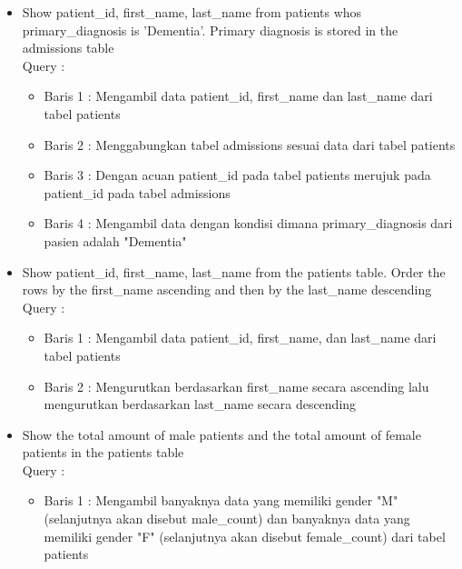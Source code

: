\documentclass[]{article}
\begin{document}
\begin{itemize}
        \item Show patient\_id, first\_name, last\_name from patients whos
        \\primary\_diagnosis is 'Dementia'. Primary diagnosis is stored in the admissions table
        \\Query :
        
        \begin{itemize}
            \item Baris 1 : Mengambil data patient\_id, first\_name dan last\_name dari tabel patients
            \item Baris 2 : Menggabungkan tabel admissions sesuai data dari tabel patients
            \item Baris 3 : Dengan acuan patient\_id pada tabel patients merujuk pada patient\_id pada tabel admissions
            \item Baris 4 : Mengambil data dengan kondisi dimana primary\_diagnosis dari pasien adalah "Dementia"
        \end{itemize}

        \item Show patient\_id, first\_name, last\_name from the patients table.
        Order the rows by the first\_name ascending and then by the last\_name descending
        \\Query :
        
        \begin{itemize}
            \item Baris 1 : Mengambil data patient\_id, first\_name, dan last\_name dari tabel patients
            \item Baris 2 : Mengurutkan berdasarkan first\_name secara ascending lalu mengurutkan berdasarkan last\_name secara descending
        \end{itemize}

        \item Show the total amount of male patients and the total amount of female patients in the patients table
        \\Query :
        
        \begin{itemize}
            \item Baris 1 : Mengambil banyaknya data yang memiliki gender "M" (selanjutnya akan disebut male\_count) dan banyaknya data yang memiliki gender "F" (selanjutnya akan disebut female\_count) dari tabel patients 
        \end{itemize}


\end{itemize}
\end{document}
